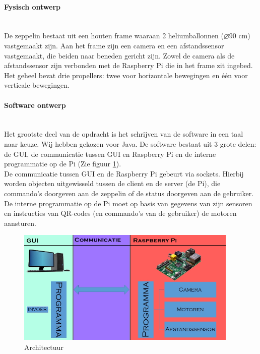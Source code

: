 \documentclass[eind]{penoverslag}
\begin{document}
\paragraph{Fysisch ontwerp}
~\\
De zeppelin bestaat uit een houten frame waaraan 2 heliumballonnen ($\diameter$90 cm) vastgemaakt zijn. Aan het frame zijn een camera en een afstandssensor vastgemaakt, die beiden naar beneden gericht zijn. Zowel de camera als de afstandssensor zijn verbonden met de Raspberry Pi die in het frame zit ingebed. Het geheel bevat drie propellers: twee voor horizontale bewegingen en \'{e}\'{e}n voor verticale bewegingen.


\paragraph{Software ontwerp}
~\\
Het grootste deel van de opdracht is het schrijven van de software in een taal naar keuze. Wij hebben gekozen voor Java. De software bestaat uit 3 grote delen: de GUI, de communicatie tussen GUI en Raspberry Pi en de interne programmatie op de Pi (Zie figuur \ref{schema}). \\
De communicatie tussen GUI en de Raspberry Pi gebeurt via sockets. Hierbij worden objecten uitgewisseld tussen de client en de server (de Pi), die commando's doorgeven aan de zeppelin of de status doorgeven aan de gebruiker. De interne programmatie op de Pi moet op basis van gegevens van zijn sensoren en instructies van QR-codes (en commando's van de gebruiker) de motoren aansturen.

\begin{figure}[ht!]
\centering
\includegraphics[height=55mm]{Schema.jpg}
\caption{Architectuur}
\label{schema}
\end{figure}

\newpage

\end{document}
